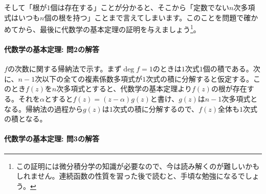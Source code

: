 そして「根が$1$個は存在する」ことが分かると、そこから「定数でない$n$次多項式はいつも$n$個の根を持つ」ことまで言えてしまいます。このことを問題で確かめてから、最後に代数学の基本定理の証明を与えましょう\footnote{この証明には微分積分学の知識が必要なので、今は読み解くのが難しいかもしれません。連続函数の性質を習った後で読むと、手頃な勉強になるでしょう。}。

\paragraph{代数学の基本定理: 問2の解答}
$f$の次数に関する帰納法で示す。まず$\deg f=1$のときは$1$次式$1$個の積である。次に、$n-1$次以下の全ての複素係数多項式が$1$次式の積に分解すると仮定する。このとき$f(z)$を$n$次多項式とすると、代数学の基本定理より$f(z)$の根が存在する。それを$\alpha$とすると$f(z)=(z-\alpha)g(z)$と書け、$g(z)$は$n-1$次多項式となる。帰納法の過程から$g(z)$は$1$次式の積に分解するので、$f(z)$全体も$1$次式の積となる。


\paragraph{代数学の基本定理: 問3の解答}

